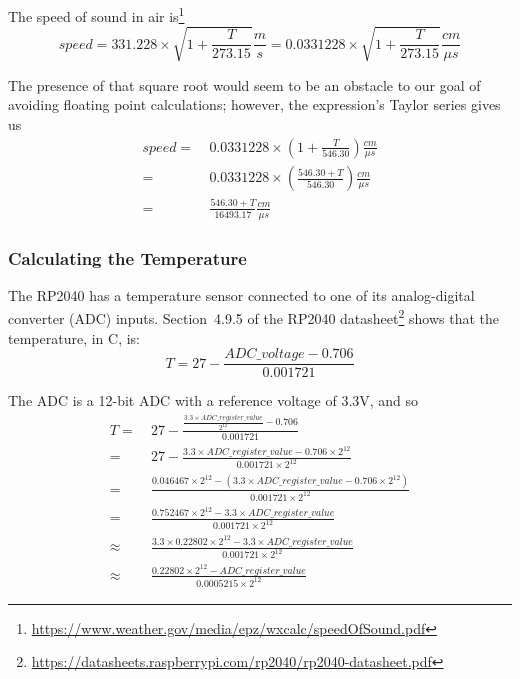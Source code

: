 The speed of sound in air is\footnote{
    \url{https://www.weather.gov/media/epz/wxcalc/speedOfSound.pdf}
}
\[
    speed = 331.228 \times \sqrt{1 + \frac{T}{273.15}} \frac{m}{s} = 0.0331228 \times \sqrt{1 + \frac{T}{273.15}} \frac{cm}{\mu s}
\]

The presence of that square root would seem to be an obstacle to our goal of avoiding floating point calculations;
however, the expression's Taylor series gives us
\begin{align*}
    speed = &\ 0.0331228 \times \left( 1 + \frac{T}{546.30} \right) \frac{cm}{\mu s}      \\
          = &\ 0.0331228 \times \left( \frac{546.30 + T}{546.30} \right) \frac{cm}{\mu s} \\
          = &\ \frac{546.30 + T}{16493.17} \frac{cm}{\mu s}
\end{align*}


\subsubsection{Calculating the Temperature}

The RP2040 has a temperature sensor connected to one of its analog-digital converter (ADC) inputs.
Section~4.9.5 of the RP2040 datasheet\footnote{\url{https://datasheets.raspberrypi.com/rp2040/rp2040-datasheet.pdf}} shows that the temperature, in \degree C, is:
\[
    T = 27 - \frac{ADC\_voltage - 0.706}{0.001721}
\]

The ADC is a 12-bit ADC with a reference voltage of 3.3V, and so
\begin{align*}
    T =       &\ 27 - \frac{\frac{3.3 \times ADC\_register\_value}{2^{12}} - 0.706}{0.001721}                                                 \\
      =       &\ 27 - \frac{3.3 \times ADC\_register\_value - 0.706 \times 2^{12}}{0.001721 \times 2^{12}}                                    \\
      =       &\ \frac{0.046467 \times 2^{12} - \left( 3.3 \times ADC\_register\_value - 0.706 \times 2^{12} \right)}{0.001721 \times 2^{12}} \\
      =       &\ \frac{0.752467 \times 2^{12} - 3.3 \times ADC\_register\_value}{0.001721 \times 2^{12}}                                      \\
      \approx &\ \frac{3.3 \times 0.22802 \times 2^{12} - 3.3 \times ADC\_register\_value}{0.001721 \times 2^{12}}                            \\
      \approx &\ \frac{0.22802 \times 2^{12} - ADC\_register\_value}{0.0005215 \times 2^{12}}
\end{align*}


